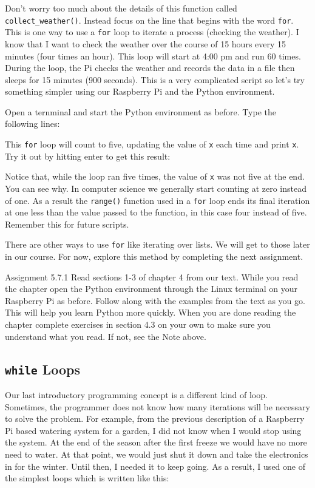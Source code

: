 \documentclass[
]{book}
\begin{document}
Don't worry too much about the details of this function called \texttt{collect\_weather()}. Instead focus on the line that begins with the word \texttt{for}. This is one way to use a \texttt{for} loop to iterate a process (checking the weather). I know that I want to check the weather over the course of 15 hours every 15 minutes (four times an hour). This loop will start at 4:00 pm and run 60 times. During the loop, the Pi checks the weather and records the data in a file then sleeps for 15 minutes (900 seconds). This is a very complicated script so let's try something simpler using our Raspberry Pi and the Python environment.

Open a ternminal and start the Python environment as before. Type the following lines:

This \texttt{for} loop will count to five, updating the value of \texttt{x} each time and print \texttt{x}. Try it out by hitting enter to get this result:

Notice that, while the loop ran five times, the value of \texttt{x} was not five at the end. You can see why. In computer science we generally start counting at zero instead of one. As a result the \texttt{range()} function used in a \texttt{for} loop ends its final iteration at one less than the value passed to the function, in this case four instead of five. Remember this for future scripts.

There are other ways to use \texttt{for} like iterating over lists. We will get to those later in our course. For now, explore this method by completing the next assignment.

Assignment 5.7.1
Read sections 1-3 of chapter 4 from our text. While you read the chapter open the Python environment through the Linux terminal on your Raspberry Pi as before. Follow along with the examples from the text as you go. This will help you learn Python more quickly. When you are done reading the chapter complete exercises in section 4.3 on your own to make sure you understand what you read. If not, see the Note above.

\hypertarget{while-loops}{%
\subsection{\texorpdfstring{\texttt{while} Loops}{while Loops}}\label{while-loops}}

Our last introductory programming concept is a different kind of loop. Sometimes, the programmer does not know how many iterations will be necessary to solve the problem. For example, from the previous description of a Raspberry Pi based watering system for a garden, I did not know when I would stop using the system. At the end of the season after the first freeze we would have no more need to water. At that point, we would just shut it down and take the electronics in for the winter. Until then, I needed it to keep going. As a result, I used one of the simplest loops which is written like this:
\end{document}
